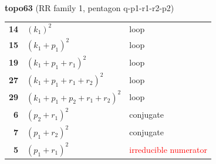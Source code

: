 \documentclass[10pt]{article}
\begin{document}
\begin{minipage}[t]{0.48\textwidth}
{}\\[2mm]\textbf{topo63} (RR family 1, pentagon q-p1-r1-r2-p2)\\[2pt]{\footnotesize\begin{tabular}{@{}r@{\ \ }l@{\ \ }l@{}}\textbf{14} & $(k_1)^2$ & loop\\
\textbf{15} & $(k_1+p_1)^2$ & loop\\
\textbf{19} & $(k_1+p_1+r_1)^2$ & loop\\
\textbf{27} & $(k_1+p_1+r_1+r_2)^2$ & loop\\
\textbf{29} & $(k_1+p_1+p_2+r_1+r_2)^2$ & loop\\
\textbf{6} & $(p_2+r_1)^2$ & conjugate\\
\textbf{7} & $(p_1+r_2)^2$ & conjugate\\
\textbf{5} & $(p_1+r_1)^2$ & \textcolor{red}{irreducible numerator}\\\end{tabular}}\end{minipage}\hfill%
\end{document}
